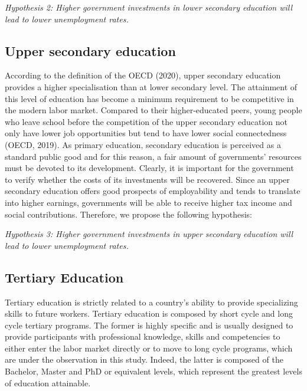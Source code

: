 \documentclass[
]{article}
\begin{document}
\emph{Hypothesis 2: Higher government investments in lower secondary
education will lead to lower unemployment rates.}

\hypertarget{upper-secondary-education}{%
\subsection{Upper secondary education}\label{upper-secondary-education}}

According to the definition of the OECD (2020), upper secondary
education provides a higher specialisation than at lower secondary
level. The attainment of this level of education has become a minimum
requirement to be competitive in the modern labor market. Compared to
their higher-educated peers, young people who leave school before the
competition of the upper secondary education not only have lower job
opportunities but tend to have lower social connectedness (OECD, 2019).
As primary education, secondary education is perceived as a standard
public good and for this reason, a fair amount of governments' resources
must be devoted to its development. Clearly, it is important for the
government to verify whether the costs of its investments will be
recovered. Since an upper secondary education offers good prospects of
employability and tends to translate into higher earnings, governments
will be able to receive higher tax income and social contributions.
Therefore, we propose the following hypothesis:

\emph{Hypothesis 3: Higher government investments in upper secondary
education will lead to lower unemployment rates.}

\hypertarget{tertiary-education}{%
\subsection{Tertiary Education}\label{tertiary-education}}

Tertiary education is strictly related to a country's ability to provide
specializing skills to future workers. Tertiary education is composed by
short cycle and long cycle tertiary programs. The former is highly
specific and is usually designed to provide participants with
professional knowledge, skills and competencies to either enter the
labor market directly or to move to long cycle programs, which are under
the observation in this study. Indeed, the latter is composed of the
Bachelor, Master and PhD or equivalent levels, which represent the
greatest levels of education attainable.
\end{document}
